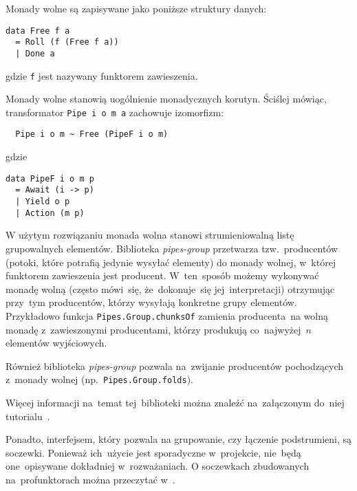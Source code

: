 \documentclass[../../praca.tex]{subfiles}
\begin{document}
Monady wolne są zapisywane jako poniższe struktury danych:
\begin{verbatim}
data Free f a
  = Roll (f (Free f a))
  | Done a
\end{verbatim}
gdzie \texttt{f} jest nazywany funktorem zawieszenia.

Monady wolne stanowią uogólnienie monadycznych korutyn. Ściślej mówiąc,
transformator \texttt{Pipe i o m a} zachowuje izomorfizm:

\begin{verbatim}
  Pipe i o m ~ Free (PipeF i o m)
\end{verbatim}
gdzie
\begin{verbatim}
data PipeF i o m p
  = Await (i -> p)
  | Yield o p
  | Action (m p)
\end{verbatim}

W użytym rozwiązaniu monada wolna stanowi strumieniowalną listę grupowalnych
elementów. Biblioteka \emph{pipes-group} przetwarza tzw.~producentów
(potoki, które potrafią jedynie wysyłać elementy) do monady wolnej,
w~której funktorem zawieszenia jest producent. W~ten~sposób możemy 
wykonywać monadę wolną (często mówi~się, że~dokonuje~się jej~interpretacji)
otrzymując przy~tym producentów, którzy wysyłają konkretne grupy elementów.
Przykładowo funkcja \texttt{Pipes.Group.chunksOf} zamienia producenta~na wolną monadę
z~zawieszonymi producentami, którzy produkują co~najwyżej~\( n \) elementów
wyjściowych.

Również biblioteka \emph{pipes-group} pozwala na~zwijanie producentów
pochodzących z~monady wolnej (np.~\texttt{Pipes.Group.folds}).

Więcej informacji na~temat tej~biblioteki można znaleźć na~załączonym
do~niej tutorialu~\cite{Hackage:Pipes-Groups-Tut}.

Ponadto, interfejsem, który pozwala na grupowanie, czy łączenie podstrumieni,
są soczewki. Ponieważ ich~użycie jest sporadyczne w~projekcie, nie~będą
one~opisywane dokładniej w~rozważaniach. O soczewkach zbudowanych
na~profunktorach można przeczytać w~\cite{Pickering_2017}.
\end{document}
